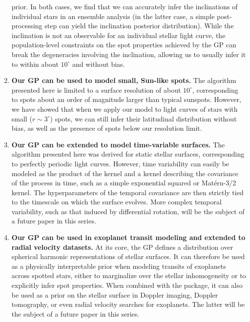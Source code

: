 \documentclass[modern,linenumbers]{aastex62}
\begin{document}
\begin{enumerate}
          prior. In both cases, we find that we can accurately infer the inclinations
          of individual stars in an ensemble analysis (in the latter case, a
          simple post-processing step can yield the inclination posterior distribution).
          While the inclination is not an observable for an individual stellar light
          curve, the population-level constraints on the spot properties achieved
          by the GP can break the degeneracies involving the inclination, allowing
          us to usually infer it to within about $10^\circ$ and without bias.
    \item \textbf{Our GP can be used to model small, Sun-like spots.} The algorithm
          presented here is limited to a surface resolution of about $10^\circ$,
          corresponding to spots about an order of magnitude larger than typical
          sunspots. However, we have showed that when we apply our model to
          light curves of stars with small ($r \sim 3^\circ$) spots, we can
          still infer their latitudinal distribution without bias, as well as
          the presence of spots below our resolution limit.
    \item \textbf{Our GP can be extended to model time-variable surfaces.} The
          algorithm presented here was derived for static stellar surfaces,
          corresponding to perfectly periodic light curves. However, time
          variability can easily be modeled as the product of the \starryprocess
          kernel and a kernel describing the covariance of the process in
          time, such as a simple exponential squared or Mat\'ern-3/2 kernel.
          The hyperparameters of the temporal covariance are then strictly
          tied to the timescale on which the surface evolves. More
          complex temporal variability, such as that induced by differential
          rotation, will be the subject of a future paper in this series.
    \item \textbf{Our GP can be used in exoplanet transit modeling and extended to
              radial velocity datasets.} At its core, the \starryprocess GP
          defines a distribution over spherical harmonic representations
          of stellar surfaces. It can therefore be used as a physically
          interpretable prior when modeling transits of exoplanets across
          spotted stars, either to marginalize over the stellar inhomogeneity
          or to explicitly infer spot properties. When combined with the
          \starry package, it can also be used as a
          prior on the stellar surface in Doppler imaging, Doppler tomography,
          or even radial velocity searches for exoplanets. The latter will
          be the subject of a future paper in this series.
\end{enumerate}
\end{document}
